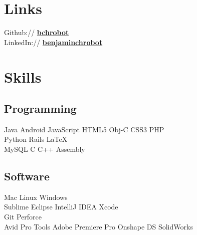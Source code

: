 \documentclass[letterpaper]{deedy-resume} %
\begin{document}
\begin{minipage}[t]{0.33\textwidth}
\section{Links} 

Github:// \href{https://github.com/bchrobot}{\bf bchrobot} \\
LinkedIn:// \href{https://www.linkedin.com/in/benjaminchrobot/}{\bf benjaminchrobot} \\

\sectionspace %


\section{Skills}

\subsection{Programming}

Java \textbullet{}
Android \textbullet{}
JavaScript \textbullet{}
HTML5 \textbullet{}
Obj-C \textbullet{}
CSS3 \textbullet{}
PHP \\
Python \textbullet{}
Rails \textbullet{}
\LaTeX\ \\
MySQL \textbullet{}
C \textbullet{}
C++ \textbullet{}
Assembly \\

\sectionspace %

\subsection{Software}
Mac \textbullet{}
Linux \textbullet{}
Windows \\
Sublime \textbullet{}
Eclipse \textbullet{}
IntelliJ IDEA \textbullet{}
Xcode \\
Git \textbullet{}
Perforce \\
Avid Pro Tools \textbullet{}
Adobe Premiere Pro \textbullet{}
Onshape \textbullet{}
DS SolidWorks \\




\end{minipage}
\end{document}
